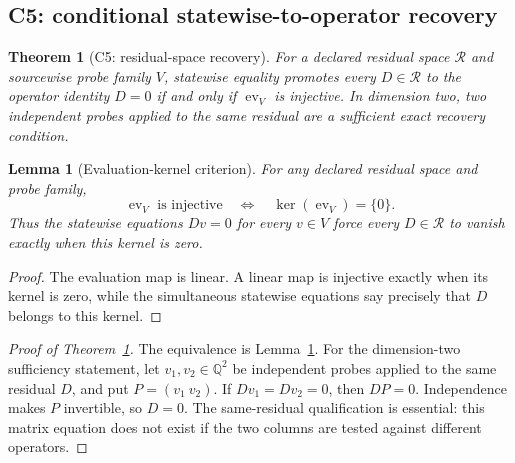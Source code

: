 \documentclass[11pt]{article}
\newtheorem{theorem}{Theorem}
\newtheorem{lemma}{Lemma}
\theoremstyle{definition}
\theoremstyle{remark}
\newcommand{\QQ}{\mathbb{Q}}
\begin{document}
\subsection{C5: conditional statewise-to-operator recovery}

\begin{theorem}[C5: residual-space recovery]
\label{thm:c5}
For a declared residual space \(\mathcal R\) and sourcewise probe family
\(V\), statewise equality promotes every \(D\in\mathcal R\) to the operator
identity \(D=0\) if and only if \(\operatorname{ev}_V\) is injective.
In dimension two, two independent probes applied to the same residual are a
sufficient exact recovery condition.
\end{theorem}

\begin{lemma}[Evaluation-kernel criterion]
\label{lem:c5-kernel}
For any declared residual space and probe family,
\[
  \operatorname{ev}_V\text{ is injective}
  \quad\Longleftrightarrow\quad
  \ker(\operatorname{ev}_V)=\{0\}.
\]
Thus the statewise equations \(Dv=0\) for every \(v\in V\) force every
\(D\in\mathcal R\) to vanish exactly when this kernel is zero.
\end{lemma}

\begin{proof}
The evaluation map is linear.  A linear map is injective exactly when its
kernel is zero, while the simultaneous statewise equations say precisely that
\(D\) belongs to this kernel.
\end{proof}

\begin{proof}[Proof of Theorem~\ref{thm:c5}]
The equivalence is Lemma~\ref{lem:c5-kernel}.  For the dimension-two
sufficiency statement, let \(v_1,v_2\in\QQ^2\) be independent probes applied
to the same residual \(D\), and put \(P=(v_1\ v_2)\).  If
\(Dv_1=Dv_2=0\), then \(DP=0\).  Independence makes \(P\) invertible, so
\(D=0\).  The same-residual qualification is essential: this matrix equation
does not exist if the two columns are tested against different operators.
\end{proof}
\end{document}
